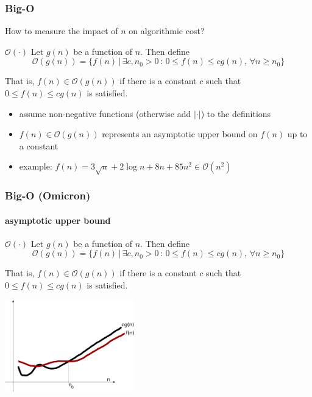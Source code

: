 \documentclass[10pt]{beamer}
\newcommand{\mO}{{\mathcal{O}}}
\begin{document}
\begin{frame}
\frametitle{Big-O}
How to measure the impact of $n$ on algorithmic cost?
\begin{block}{$\mO(\cdot)$}
Let $g(n)$ be a function of $n$.  Then define
\begin{equation*}
  \mO(g(n)) = \{f(n)\,|\, \exists c,n_0>0 \,:\, 0\leq f(n)\leq cg(n),\, \forall
n\geq n_0\}
\end{equation*}

That is, $f(n)\in \mO(g(n))$ if there is a constant $c$ such that $0\leq f(n)
\leq cg(n)$ is satisfied.
\end{block}
\begin{itemize}
  \item assume non-negative functions (otherwise add $| \cdot |$) to the definitions
  \item $f(n)\in\mO(g(n))$ represents an asymptotic upper bound on $f(n)$ up to a constant
  \item example: $f(n) = 3\sqrt{n} + 2\log n + 8 n + 85 n^2 \in \mO(n^2)$
\end{itemize}
\end{frame}
\begin{frame}
\frametitle{Big-O (Omicron)}
\framesubtitle{asymptotic upper bound}
\begin{block}{$\mO(\cdot)$}
Let $g(n)$ be a function of $n$.  Then define
\begin{equation*}
  \mO(g(n)) = \{f(n)\,|\, \exists c,n_0>0 \,:\, 0\leq f(n)\leq cg(n),\, \forall
n\geq n_0\}
\end{equation*}

That is, $f(n)\in \mO(g(n))$ if there is a constant $c$ such that $0\leq f(n)
\leq cg(n)$ is satisfied.
\end{block}
\begin{center}
  \includegraphics[height=4cm]{./figs/bigo_1}
\end{center}
\end{frame}
\end{document}
